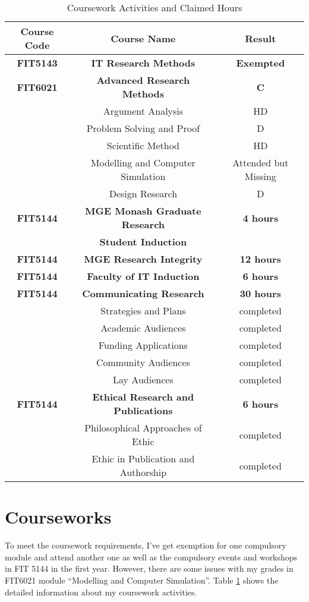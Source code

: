 \begin{table}[h]
\centering
\begin{tabular}{|c|c|c|}
\hline
\bf Course Code & \bf Course Name & \bf Result \\ \hline
\bf FIT5143 & \bf IT Research Methods & \bf Exempted \\ \hline
\bf  FIT6021 & \bf Advanced Research Methods & \bf C \\ \hline
& Argument Analysis & HD \\ \hline
& Problem Solving and Proof & D \\ \hline
& Scientific Method & HD \\ \hline
& Modelling and Computer Simulation & Attended but Missing \\ \hline
& Design Research & D \\ \hline
\bf FIT5144 & \bf MGE Monash Graduate Research & \bf 4 hours \\ 
& \bf Student Induction &  \\ \hline
\bf FIT5144 & \bf MGE  Research Integrity & \bf 12 hours \\ \hline
\bf FIT5144 & \bf Faculty of IT Induction & \bf 6 hours \\ \hline
\bf FIT5144 & \bf Communicating Research & \bf 30 hours\\ \hline
& Strategies and Plans & completed \\ \hline
& Academic Audiences & completed \\ \hline
& Funding Applications & completed \\ \hline
& Community Audiences & completed \\ \hline
& Lay Audiences & completed \\ \hline
\bf FIT5144 & \bf Ethical Research and Publications & \bf 6 hours\\ \hline
& Philosophical Approaches of Ethic & completed \\ \hline
& Ethic in Publication and Authorship & completed \\ \hline
\end{tabular}
\caption{Coursework Activities and Claimed Hours}
\label{tlb:coursework}
\end{table}

\section{Courseworks}
To meet the coursework requirements, I've get exemption for one compulsory module and attend another one as well as the compulsory events and workshops in FIT 5144 in the first year. However, there are some issues with my grades in FIT6021 module ``Modelling and Computer Simulation''. Table \ref{tlb:coursework} shows the detailed information about my coursework activities. 

